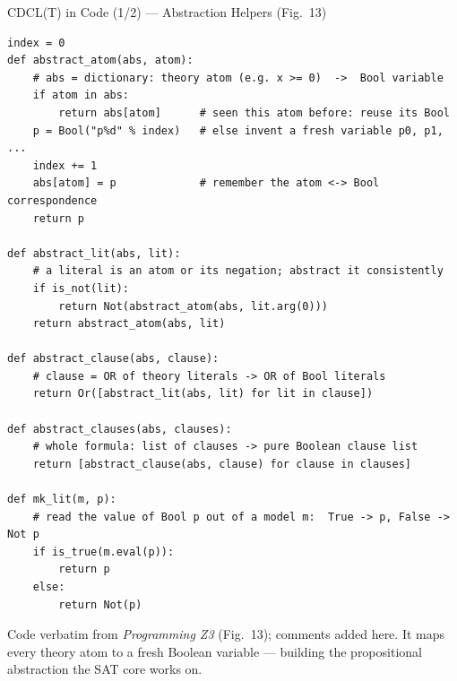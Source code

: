 \documentclass[10pt,aspectratio=169,xcolor={table}]{beamer}
\begin{document}
\begin{frame}[fragile]{CDCL(T) in Code (1/2) --- Abstraction Helpers (Fig.~13)}
\begin{lstlisting}[style=py,basicstyle=\ttfamily\tiny]
index = 0
def abstract_atom(abs, atom):
    # abs = dictionary: theory atom (e.g. x >= 0)  ->  Bool variable
    if atom in abs:
        return abs[atom]      # seen this atom before: reuse its Bool
    p = Bool("p%d" % index)   # else invent a fresh variable p0, p1, ...
    index += 1
    abs[atom] = p             # remember the atom <-> Bool correspondence
    return p

def abstract_lit(abs, lit):
    # a literal is an atom or its negation; abstract it consistently
    if is_not(lit):
        return Not(abstract_atom(abs, lit.arg(0)))
    return abstract_atom(abs, lit)

def abstract_clause(abs, clause):
    # clause = OR of theory literals -> OR of Bool literals
    return Or([abstract_lit(abs, lit) for lit in clause])

def abstract_clauses(abs, clauses):
    # whole formula: list of clauses -> pure Boolean clause list
    return [abstract_clause(abs, clause) for clause in clauses]

def mk_lit(m, p):
    # read the value of Bool p out of a model m:  True -> p, False -> Not p
    if is_true(m.eval(p)):
        return p
    else:
        return Not(p)
\end{lstlisting}
  {\scriptsize Code verbatim from \emph{Programming Z3} (Fig.~13); comments
   added here. It maps every theory atom to a fresh Boolean variable ---
   building the propositional abstraction the SAT core works on.}
\end{frame}
\end{document}

